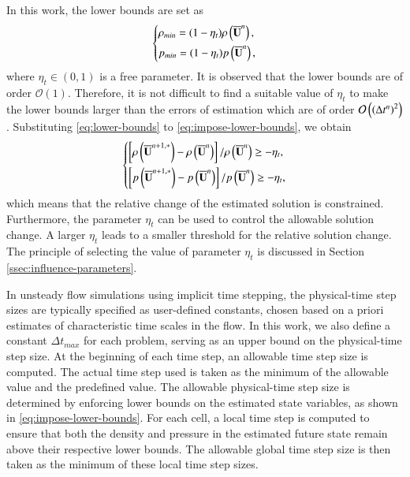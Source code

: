 In this work, the lower bounds are set as 
\begin{equation}
\label{eq:lower-bounds}
    \begin{dcases}
        \rho_{min}= (1-\eta_t) \rho \left(\overline{\mathbf{U}}^n\right), \\
        p_{min}= (1-\eta_t) p \left(\overline{\mathbf{U}}^n\right),
    \end{dcases}
\end{equation}
where $\eta_t \in (0,1)$ is a free parameter. It is observed that 
the lower bounds are of order $\mathcal{O}\left(1\right)$. Therefore,
it is not difficult to find a suitable value of $\eta_t$ to make the lower bounds larger than the errors of estimation which are of order $\mathcal{O}\left(\left(\mathrm\Delta t^n\right)^2\right)$. Substituting \eqref{eq:lower-bounds} to \eqref{eq:impose-lower-bounds}, we obtain
\begin{equation}
    \begin{dcases}
        \left[\rho \left(\overline{\mathbf{U}}^{n+1,*}\right)- \rho \left(\overline{\mathbf{U}}^n\right)\right]/\rho \left(\overline{\mathbf{U}}^n\right) \geq -\eta_t , \\
        \left[p \left(\overline{\mathbf{U}}^{n+1,*}\right)- p \left(\overline{\mathbf{U}}^n\right)\right]/p \left(\overline{\mathbf{U}}^n\right) \geq -\eta_t ,
    \end{dcases}
\end{equation}
which means that the relative change of the estimated solution is constrained. Furthermore, the parameter $\eta_t$ can be used to control the allowable solution change. A larger $\eta_t$ leads to a smaller threshold for the relative solution change. The principle of selecting the value of parameter $\eta_t$ is discussed in Section \ref{ssec:influence-parameters}.

In unsteady flow simulations using implicit time stepping, the physical-time step sizes are typically specified as user-defined constants, chosen based on a priori estimates of characteristic time scales in the flow. 
In this work, we also define a constant $\Delta t_{max}$ for each problem, serving as an upper bound on the physical-time step size. At the beginning of each time step, an allowable time step size is computed. The actual time step used is taken as the minimum of the allowable value and the predefined value.
The allowable physical-time step size is determined by enforcing lower bounds on the estimated state variables, as shown in \eqref{eq:impose-lower-bounds}. For each cell, a local time step is computed to ensure that both the density and pressure in the estimated future state remain above their respective lower bounds. The allowable global time step size is then taken as the minimum of these local time step sizes.


